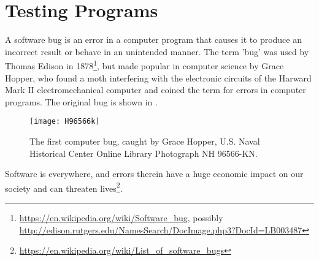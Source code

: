 \chapter{Testing Programs}
\label{chap:testing}
A software bug is an error in a computer program that causes it to produce an incorrect result or behave in an unintended manner. The term 'bug' was used by Thomas Edison in 1878\footnote{\url{https://en.wikipedia.org/wiki/Software_bug}, possibly \url{http://edison.rutgers.edu/NamesSearch/DocImage.php3?DocId=LB003487}}, but made popular in computer science by Grace Hopper, who found a moth interfering with the electronic circuits of the Harward Mark II electromechanical computer and coined the term  for errors in computer programs. The original bug is shown in .
\begin{figure}
  \centering
  \texttt{[image: H96566k]}
  \caption{The first computer bug, caught by Grace Hopper, U.S. Naval Historical Center Online Library Photograph NH 96566-KN.}
  \label{fig:bug}
\end{figure}
Software is everywhere, and errors therein have a huge economic impact on our society and can threaten lives\footnote{\url{https://en.wikipedia.org/wiki/List_of_software_bugs}}.

